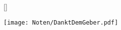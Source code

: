 []

\beginverse
\endverse
\texttt{[image: Noten/DanktDemGeber.pdf]}

\endsong

\beginscripture{}~\\
\endscripture
